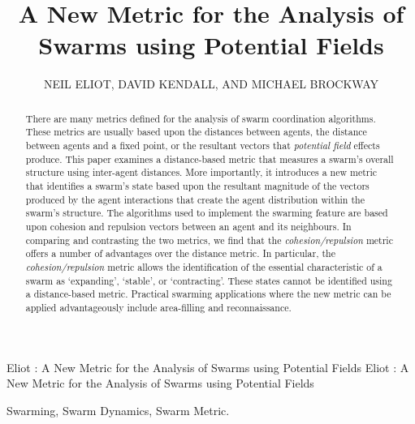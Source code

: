 \documentclass{ieeeaccess}
\begin{document}

\title{A New Metric for the Analysis of Swarms using Potential Fields}
\author{\uppercase{Neil Eliot},
\uppercase{David Kendall, and Michael Brockway}}
\address[1]{Northumbria University, Department of Computing and Information Sciences, 
Newcastle upon Tyne, NE1 8ST}

\markboth
{Eliot \headeretal: A New Metric for the Analysis of Swarms using Potential Fields}
{Eliot \headeretal: A New Metric for the Analysis of Swarms using Potential Fields}



\begin{abstract}
  There are many metrics defined for the analysis of swarm coordination
  algorithms. These metrics are usually based upon the distances between
  agents, the distance between agents and a fixed point, or the resultant
  vectors that \textit{potential field} effects produce. This paper examines a
  distance-based metric that measures a swarm's overall structure using
  inter-agent distances. More importantly, it introduces a new metric that
  identifies a swarm's state based upon the resultant magnitude of the vectors
  produced by the agent interactions that create the agent distribution within
  the swarm's structure. The algorithms used to implement the swarming feature
  are based upon cohesion and repulsion vectors between an agent and its
  neighbours. In comparing and contrasting the two metrics, we find that the
  \textit{cohesion/repulsion} metric offers a number of advantages over the
  distance metric. In particular, the \textit{cohesion/repulsion} metric allows
  the identification of the essential characteristic of a swarm as `expanding',
  `stable', or `contracting'. These states cannot be identified using a
  distance-based metric. Practical swarming applications where the new metric
  can be applied advantageously include area-filling and reconnaissance.
\end{abstract}

\begin{keywords}
Swarming, Swarm Dynamics, Swarm Metric.
\end{keywords}
\end{document}
